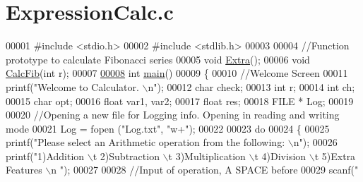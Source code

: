 \hypertarget{_expression_calc_8c_source}{\section{Expression\+Calc.\+c}
\label{_expression_calc_8c_source}
}

\begin{DoxyCode}
00001 \textcolor{preprocessor}{#include <stdio.h>}
00002 \textcolor{preprocessor}{#include <stdlib.h>}
00003 
00004 \textcolor{comment}{//Function prototype to calculate Fibonacci series}
00005 \textcolor{keywordtype}{void} \hyperlink{_expression_calc_8c_a79cd2ba7236d8017474e3340e169f888}{Extra}();
00006 \textcolor{keywordtype}{void} \hyperlink{_expression_calc_8c_a1f044085ede204d3d2ba2e4db44e7e5d}{CalcFib}(\textcolor{keywordtype}{int} r);                                             
00007 
\hypertarget{_expression_calc_8c_source_l00008}{}\hyperlink{_expression_calc_8c_ae66f6b31b5ad750f1fe042a706a4e3d4}{00008} \textcolor{keywordtype}{int} \hyperlink{_expression_calc_8c_ae66f6b31b5ad750f1fe042a706a4e3d4}{main}()
00009 \{
00010   \textcolor{comment}{//Welcome Screen}
00011   printf(\textcolor{stringliteral}{"Welcome to Calculator. \(\backslash\)n"});                          
00012   \textcolor{keywordtype}{char} check;
00013   \textcolor{keywordtype}{int} r;
00014   \textcolor{keywordtype}{int} ch;
00015   \textcolor{keywordtype}{char} opt;
00016   \textcolor{keywordtype}{float} var1, var2;
00017   \textcolor{keywordtype}{float} res;
00018   FILE * Log;
00019   
00020   \textcolor{comment}{//Opening a new file for Logging info. Opening in reading and writing mode}
00021   Log = fopen (\textcolor{stringliteral}{"Log.txt"}, \textcolor{stringliteral}{"w+"});                            
00022       
00023     \textcolor{keywordflow}{do}
00024     \{                                                           
00025       printf(\textcolor{stringliteral}{"Please select an Arithmetic operation from the following: \(\backslash\)n"});           
00026       printf(\textcolor{stringliteral}{"1)Addition \(\backslash\)t 2)Subtraction \(\backslash\)t 3)Multiplication \(\backslash\)t 4)Division \(\backslash\)t 5)Extra Features \(\backslash\)n "});
00027       
00028       \textcolor{comment}{//Input of operation, A SPACE before %
00029       scanf(\textcolor{stringliteral}{" %
}}
\end{DoxyCode}
